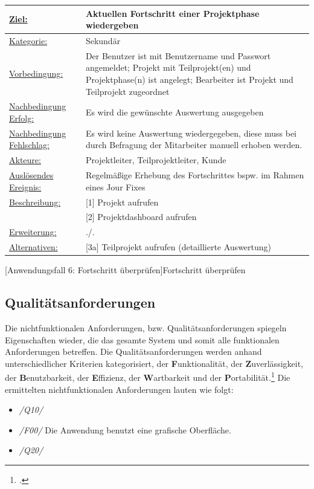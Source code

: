 \label{tab:UC6}
\begin{tabularx}{\textwidth}{|p{}|p{}|}
        \hline
        \underline{Ziel:} & Aktuellen Fortschritt einer Projektphase wiedergeben\\\hline
        \underline{Kategorie:} & Sekundär \\\hline
        \underline{Vorbedingung:} & Der Benutzer ist mit Benutzername und Passwort angemeldet; Projekt mit Teilprojekt(en) und Projektphase(n) ist angelegt; Bearbeiter ist Projekt und Teilprojekt zugeordnet\\\hline
        \underline{Nachbedingung Erfolg:} & Es wird die gewünschte Auswertung ausgegeben\\\hline
        \underline{Nachbedingung Fehlschlag:} &  Es wird keine Auswertung wiedergegeben, diese muss bei durch Befragung der Mitarbeiter manuell erhoben werden.\\\hline
        \underline{Akteure:} & Projektleiter, Teilprojektleiter, Kunde \\\hline
        \underline{Auslösendes Ereignis:} & Regelmäßige Erhebung des Fortschrittes bspw. im Rahmen eines Jour Fixes \\\hline        
        \multirow{1}{*}{\underline{Beschreibung:}} & [1] Projekt aufrufen\\
        & [2] Projektdashboard aufrufen\\\hline
        \multirow{1}{*}{\underline{Erweiterung:}} & ./. \\\hline
        \underline{Alternativen:} & [3a] Teilprojekt aufrufen (detaillierte Auswertung)\\\hline
\end{tabularx}
[Anwendungsfall 6: Fortschritt überprüfen]{Fortschritt überprüfen}


\subsection{Qualitätsanforderungen}
Die nichtfunktionalen Anforderungen, bzw. Qualitätsanforderungen spiegeln Eigenschaften wieder, die das gesamte System und somit alle funktionalen Anforderungen betreffen. Die Qualitätsanforderungen werden anhand unterschiedlicher Kriterien kategorisiert, der \textbf{F}unktionalität, der \textbf{Z}uverlässigkeit, der \textbf{B}enutzbarkeit, der \textbf{E}ffizienz, der \textbf{W}artbarkeit und der \textbf{P}ortabilität.\footcite[Vgl.][S. 494 f.]{balzert} Die ermittelten nichtfunktionalen Anforderungen lauten wie folgt:
\begin{itemize}
    \item[] \emph{/Q10/}
    \item[] \emph{/F00/} Die Anwendung benutzt eine grafische Oberfläche.
    \vspace{0.5cm}
    \item[] \emph{/Q20/}
\end{itemize}

